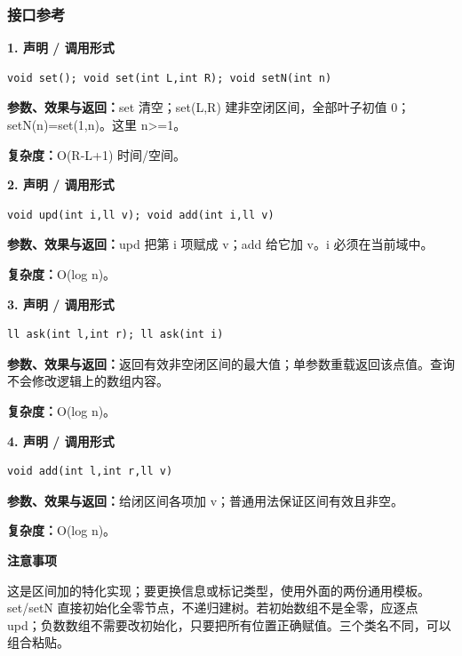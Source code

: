 \documentclass[UTF8,a4paper,10pt]{ctexart}
\newcommand{\TemplNote}[1]{\textbf{注意事项}\par #1\par}
\begin{document}
\subsubsection*{接口参考}
\noindent\begin{minipage}{\textwidth}
\textbf{1. 声明 / 调用形式}
\begin{lstlisting}
void set(); void set(int L,int R); void setN(int n)
\end{lstlisting}
\textbf{参数、效果与返回：}set 清空；set(L,R) 建非空闭区间，全部叶子初值 0；setN(n)=set(1,n)。这里 n>=1。

\textbf{复杂度：}O(R-L+1) 时间/空间。

\end{minipage}\par\vspace{0.4em}
\noindent\begin{minipage}{\textwidth}
\textbf{2. 声明 / 调用形式}
\begin{lstlisting}
void upd(int i,ll v); void add(int i,ll v)
\end{lstlisting}
\textbf{参数、效果与返回：}upd 把第 i 项赋成 v；add 给它加 v。i 必须在当前域中。

\textbf{复杂度：}O(log n)。

\end{minipage}\par\vspace{0.4em}
\noindent\begin{minipage}{\textwidth}
\textbf{3. 声明 / 调用形式}
\begin{lstlisting}
ll ask(int l,int r); ll ask(int i)
\end{lstlisting}
\textbf{参数、效果与返回：}返回有效非空闭区间的最大值；单参数重载返回该点值。查询不会修改逻辑上的数组内容。

\textbf{复杂度：}O(log n)。

\end{minipage}\par\vspace{0.4em}
\noindent\begin{minipage}{\textwidth}
\textbf{4. 声明 / 调用形式}
\begin{lstlisting}
void add(int l,int r,ll v)
\end{lstlisting}
\textbf{参数、效果与返回：}给闭区间各项加 v；普通用法保证区间有效且非空。

\textbf{复杂度：}O(log n)。

\TemplNote{这是区间加的特化实现；要更换信息或标记类型，使用外面的两份通用模板。set/setN 直接初始化全零节点，不递归建树。若初始数组不是全零，应逐点 upd；负数数组不需要改初始化，只要把所有位置正确赋值。三个类名不同，可以组合粘贴。}
\end{minipage}\par\vspace{0.4em}
\end{document}
